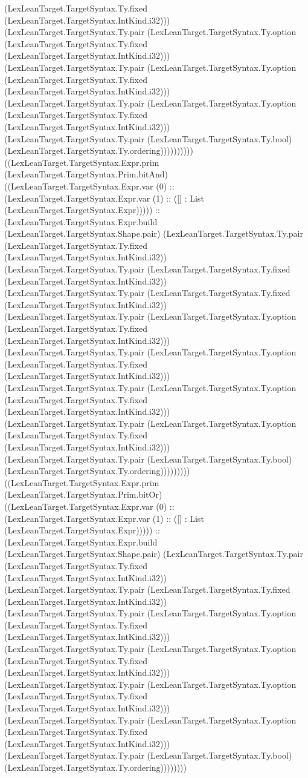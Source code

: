 \documentclass[11pt]{article}
\begin{document}
(LexLeanTarget.TargetSyntax.Ty.fixed (LexLeanTarget.TargetSyntax.IntKind.i32))) (LexLeanTarget.TargetSyntax.Ty.pair (LexLeanTarget.TargetSyntax.Ty.option (LexLeanTarget.TargetSyntax.Ty.fixed (LexLeanTarget.TargetSyntax.IntKind.i32))) (LexLeanTarget.TargetSyntax.Ty.pair (LexLeanTarget.TargetSyntax.Ty.option (LexLeanTarget.TargetSyntax.Ty.fixed (LexLeanTarget.TargetSyntax.IntKind.i32))) (LexLeanTarget.TargetSyntax.Ty.pair (LexLeanTarget.TargetSyntax.Ty.option (LexLeanTarget.TargetSyntax.Ty.fixed (LexLeanTarget.TargetSyntax.IntKind.i32))) (LexLeanTarget.TargetSyntax.Ty.pair (LexLeanTarget.TargetSyntax.Ty.bool) (LexLeanTarget.TargetSyntax.Ty.ordering)))))))))) ((LexLeanTarget.TargetSyntax.Expr.prim (LexLeanTarget.TargetSyntax.Prim.bitAnd) ((LexLeanTarget.TargetSyntax.Expr.var (0) :: (LexLeanTarget.TargetSyntax.Expr.var (1) :: ([] : List (LexLeanTarget.TargetSyntax.Expr))))) :: (LexLeanTarget.TargetSyntax.Expr.build (LexLeanTarget.TargetSyntax.Shape.pair) (LexLeanTarget.TargetSyntax.Ty.pair (LexLeanTarget.TargetSyntax.Ty.fixed (LexLeanTarget.TargetSyntax.IntKind.i32)) (LexLeanTarget.TargetSyntax.Ty.pair (LexLeanTarget.TargetSyntax.Ty.fixed (LexLeanTarget.TargetSyntax.IntKind.i32)) (LexLeanTarget.TargetSyntax.Ty.pair (LexLeanTarget.TargetSyntax.Ty.fixed (LexLeanTarget.TargetSyntax.IntKind.i32)) (LexLeanTarget.TargetSyntax.Ty.pair (LexLeanTarget.TargetSyntax.Ty.option (LexLeanTarget.TargetSyntax.Ty.fixed (LexLeanTarget.TargetSyntax.IntKind.i32))) (LexLeanTarget.TargetSyntax.Ty.pair (LexLeanTarget.TargetSyntax.Ty.option (LexLeanTarget.TargetSyntax.Ty.fixed (LexLeanTarget.TargetSyntax.IntKind.i32))) (LexLeanTarget.TargetSyntax.Ty.pair (LexLeanTarget.TargetSyntax.Ty.option (LexLeanTarget.TargetSyntax.Ty.fixed (LexLeanTarget.TargetSyntax.IntKind.i32))) (LexLeanTarget.TargetSyntax.Ty.pair (LexLeanTarget.TargetSyntax.Ty.option (LexLeanTarget.TargetSyntax.Ty.fixed (LexLeanTarget.TargetSyntax.IntKind.i32))) (LexLeanTarget.TargetSyntax.Ty.pair (LexLeanTarget.TargetSyntax.Ty.bool) (LexLeanTarget.TargetSyntax.Ty.ordering))))))))) ((LexLeanTarget.TargetSyntax.Expr.prim (LexLeanTarget.TargetSyntax.Prim.bitOr) ((LexLeanTarget.TargetSyntax.Expr.var (0) :: (LexLeanTarget.TargetSyntax.Expr.var (1) :: ([] : List (LexLeanTarget.TargetSyntax.Expr))))) :: (LexLeanTarget.TargetSyntax.Expr.build (LexLeanTarget.TargetSyntax.Shape.pair) (LexLeanTarget.TargetSyntax.Ty.pair (LexLeanTarget.TargetSyntax.Ty.fixed (LexLeanTarget.TargetSyntax.IntKind.i32)) (LexLeanTarget.TargetSyntax.Ty.pair (LexLeanTarget.TargetSyntax.Ty.fixed (LexLeanTarget.TargetSyntax.IntKind.i32)) (LexLeanTarget.TargetSyntax.Ty.pair (LexLeanTarget.TargetSyntax.Ty.option (LexLeanTarget.TargetSyntax.Ty.fixed (LexLeanTarget.TargetSyntax.IntKind.i32))) (LexLeanTarget.TargetSyntax.Ty.pair (LexLeanTarget.TargetSyntax.Ty.option (LexLeanTarget.TargetSyntax.Ty.fixed (LexLeanTarget.TargetSyntax.IntKind.i32))) (LexLeanTarget.TargetSyntax.Ty.pair (LexLeanTarget.TargetSyntax.Ty.option (LexLeanTarget.TargetSyntax.Ty.fixed (LexLeanTarget.TargetSyntax.IntKind.i32))) (LexLeanTarget.TargetSyntax.Ty.pair (LexLeanTarget.TargetSyntax.Ty.option (LexLeanTarget.TargetSyntax.Ty.fixed (LexLeanTarget.TargetSyntax.IntKind.i32))) (LexLeanTarget.TargetSyntax.Ty.pair (LexLeanTarget.TargetSyntax.Ty.bool) (LexLeanTarget.TargetSyntax.Ty.ordering)))))))) 
\end{document}
